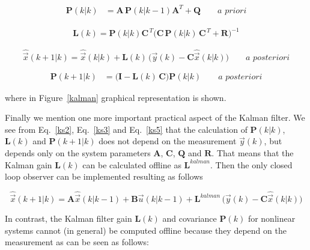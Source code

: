 \documentclass[12pt,a4paper,oneside]{book}
\begin{document}
\begin{onehalfspace}
\begin{mybox}
	\begin{equation}\label{ks2}
		\begin{aligned}
			\mathbf{P}\left(k|k\right) &= 
			\mathbf{A}\,\mathbf{P}\left(k|k-1\right) \mathbf{A}^T + \mathbf{Q} 
			\qquad \textit{a priori}
		\end{aligned}
	\end{equation}
	
	\begin{equation}\label{ks3}
		\begin{aligned}
			\mathbf{L}(k) = 
			\mathbf{P}(k|k)\mathbf{C}^{\,T}\Big(\mathbf{C}\,\mathbf{P}(k|k)\,\mathbf{C}^{\,T}+\mathbf{R}\Big)^{-1}
		\end{aligned}
	\end{equation}
	
	\begin{equation}\label{ks4}
		\hat{\vec{x}}\left(k+1|k\right) = \hat{\vec{x}}\left(k|k\right) + 
		\mathbf{L}(k)\, \Big(\vec{y}(k) - 
		\mathbf{C}\hat{\vec{x}}\left(k|k\right)\Big) \qquad \textit{a 
		posteriori}
	\end{equation}
	
	\begin{equation}\label{ks5}
		\begin{aligned}
			\mathbf{P}\left(k+1|k\right) &= 
			\Big(\mathbf{I}-\mathbf{L}(k)\,\mathbf{C} \Big) 
			\mathbf{P}\left(k|k\right)  \qquad \textit{a posteriori}
		\end{aligned}
	\end{equation}
\end{mybox}
where in Figure~\ref{kalman} graphical representation is shown.

Finally we mention one more important practical aspect of the Kalman filter. We 
see from Eq.~\eqref{ks2}, Eq.~\eqref{ks3} and Eq.~\eqref{ks5} that the 
calculation of $\mathbf{P}\left(k|k\right)$, $\mathbf{L}(k)$ and 
$\mathbf{P}\left(k+1|k\right)$ does not depend on the measurement $\vec{y}(k)$, 
but depends only on the system parameters $\mathbf{A}$, $\mathbf{C}$, 
$\mathbf{Q}$ and $\mathbf{R}$. That means that the Kalman gain $\mathbf{L}(k)$ 
can be calculated offline as $\mathbf{L}^{kalman}$. Then the only closed loop 
observer can be implemented resulting as follows
\begin{mybox}
	\begin{equation}
		\hat{\vec{x}}\left(k+1|k\right) = \mathbf{A} 
		\hat{\vec{x}}\left(k|k-1\right) + \mathbf{B} \vec{u}\left(k|k-1\right) 
		+ \mathbf{L}^{kalman}\, \Big(\vec{y}(k) - 
		\mathbf{C}\hat{\vec{x}}\left(k|k\right)\Big)
	\end{equation}
\end{mybox}
In contrast, the Kalman filter gain $\mathbf{L}(k)$ and covariance 
$\mathbf{P}(k)$ for nonlinear systems cannot (in general) be computed offline 
because they depend on the measurement as can be seen as follows:


\end{onehalfspace}
\end{document}
